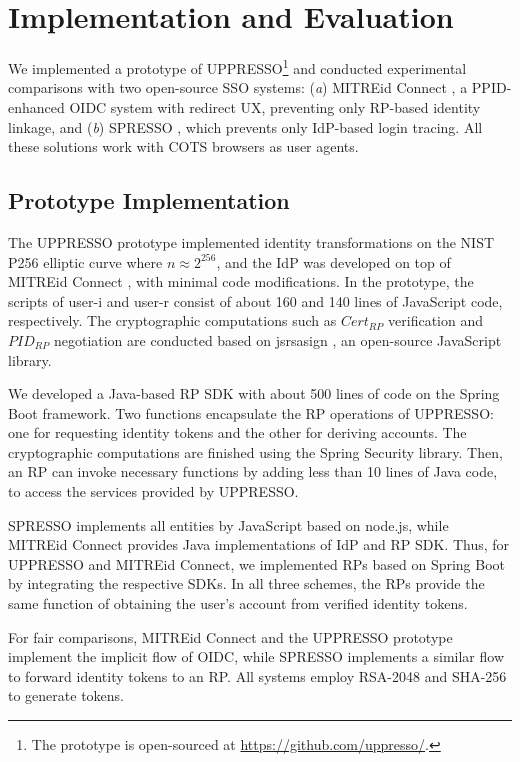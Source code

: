 \section{Implementation and Evaluation}
\label{sec:implementation}

We implemented a prototype of UPPRESSO\footnote{The prototype is open-sourced at \url{https://github.com/uppresso/}.} and conducted experimental comparisons with two open-source SSO systems:
 (\emph{a}) MITREid Connect \cite{MITREid}, a PPID-enhanced OIDC system with redirect UX, preventing only RP-based identity linkage,
 and (\emph{b}) SPRESSO \cite{SPRESSO}, which prevents only IdP-based login tracing.
All these solutions work with COTS browsers as user agents.

\subsection{Prototype Implementation}
\label{subsec:proto-imple}

The UPPRESSO prototype implemented identity transformations on the NIST P256 elliptic curve where $n \approx 2^{256}$,
and the IdP was developed on top of MITREid Connect \cite{MITREid}, %
with minimal code modifications.
In the prototype, the scripts of user-i and user-r consist of about 160 and 140 lines of JavaScript code, respectively.  %
The cryptographic computations such as $Cert_{RP}$ verification and $PID_{RP}$ negotiation are conducted based on jsrsasign \cite{jsrsasign}, an open-source JavaScript library.

We developed a Java-based RP SDK with about 500 lines of code on the Spring Boot framework.
Two functions encapsulate the RP operations of UPPRESSO: one for requesting identity tokens and the other for deriving accounts. The cryptographic computations are finished using the Spring Security library.
Then, an RP can invoke necessary functions by adding less than 10 lines of Java code,
    to access the services provided by UPPRESSO.
    

SPRESSO implements all entities by JavaScript based on node.js, while MITREid Connect provides Java implementations of IdP and RP SDK.
Thus, for UPPRESSO and MITREid Connect, we implemented RPs based on Spring Boot by integrating the respective SDKs. In all three schemes, the RPs provide the same function of obtaining the user's account from verified identity tokens.

For fair comparisons, MITREid Connect and the UPPRESSO prototype implement the implicit flow of OIDC, while SPRESSO implements a similar flow to forward identity tokens to an RP.
All systems employ RSA-2048 and SHA-256 to generate tokens.

